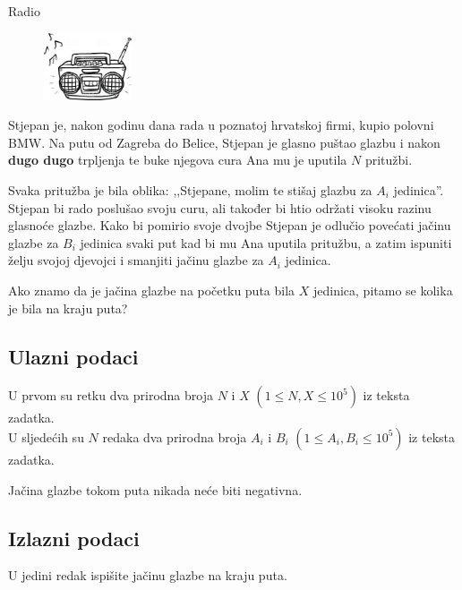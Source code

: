 \begin{statement}[
  problempoints=30,
  timelimit=1 sekunda,
  memorylimit=512 MiB,
]{Radio}

\setlength\intextsep{-0.1cm}
\begin{figure}
\centering
\includegraphics[width=0.23\textwidth]{img/radio.jpg}
\end{figure}

Stjepan je, nakon godinu dana rada u poznatoj hrvatskoj firmi, kupio polovni
BMW. Na putu od Zagreba do Belice, Stjepan je
glasno puštao glazbu i nakon \textbf{dugo dugo} trpljenja te buke njegova
cura Ana mu je uputila $N$ pritužbi.

Svaka pritužba je bila oblika:
,,Stjepane, molim te stišaj glazbu za $A_i$ jedinica''.  Stjepan bi rado
poslušao svoju curu, ali također bi htio održati visoku razinu glasnoće
glazbe. Kako bi pomirio svoje dvojbe Stjepan je odlučio povećati jačinu
glazbe za $B_i$ jedinica svaki put kad bi mu Ana uputila pritužbu, a zatim
ispuniti želju svojoj djevojci i smanjiti jačinu glazbe za $A_i$ jedinica.

Ako znamo da je jačina glazbe na početku puta bila $X$ jedinica, pitamo se
kolika je bila na kraju puta?

\subsection*{Ulazni podaci}
U prvom su retku dva prirodna broja $N$ i $X$ $(1 \le N, X \le 10^5)$ iz teksta
zadatka. \\
U sljedećih su $N$ redaka dva prirodna broja $A_i$ i $B_i$ $(1 \le A_i, B_i \le 10^5)$
iz teksta zadatka.

Jačina glazbe tokom puta nikada neće biti negativna.

\subsection*{Izlazni podaci}
U jedini redak ispišite jačinu glazbe na kraju puta.


\end{statement}
